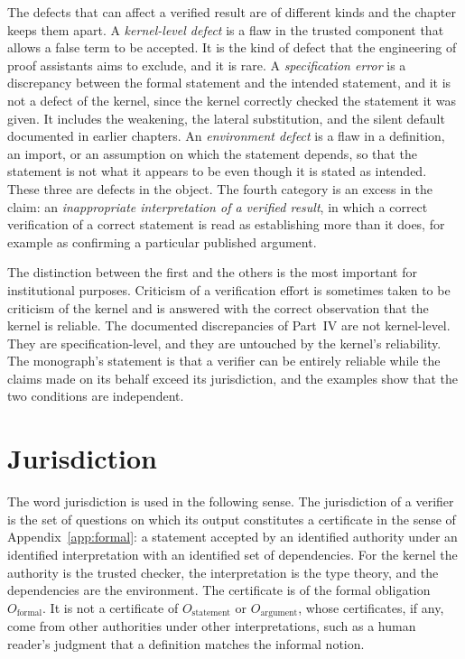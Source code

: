 The defects that can affect a verified result are of different kinds and the chapter keeps them apart. A \emph{kernel-level defect} is a flaw in the trusted component that allows a false term to be accepted. It is the kind of defect that the engineering of proof assistants aims to exclude, and it is rare. A \emph{specification error} is a discrepancy between the formal statement and the intended statement, and it is not a defect of the kernel, since the kernel correctly checked the statement it was given. It includes the weakening, the lateral substitution, and the silent default documented in earlier chapters. An \emph{environment defect} is a flaw in a definition, an import, or an assumption on which the statement depends, so that the statement is not what it appears to be even though it is stated as intended. These three are defects in the object. The fourth category is an excess in the claim: an \emph{inappropriate interpretation of a verified result}, in which a correct verification of a correct statement is read as establishing more than it does, for example as confirming a particular published argument.

The distinction between the first and the others is the most important for institutional purposes. Criticism of a verification effort is sometimes taken to be criticism of the kernel and is answered with the correct observation that the kernel is reliable. The documented discrepancies of Part~IV are not kernel-level. They are specification-level, and they are untouched by the kernel's reliability. The monograph's statement is that a verifier can be entirely reliable while the claims made on its behalf exceed its jurisdiction, and the examples show that the two conditions are independent.

\section{Jurisdiction}

The word jurisdiction is used in the following sense. The jurisdiction of a verifier is the set of questions on which its output constitutes a certificate in the sense of Appendix~\ref{app:formal}: a statement accepted by an identified authority under an identified interpretation with an identified set of dependencies. For the kernel the authority is the trusted checker, the interpretation is the type theory, and the dependencies are the environment. The certificate is of the formal obligation $O_{\mathrm{formal}}$. It is not a certificate of $O_{\mathrm{statement}}$ or $O_{\mathrm{argument}}$, whose certificates, if any, come from other authorities under other interpretations, such as a human reader's judgment that a definition matches the informal notion.

